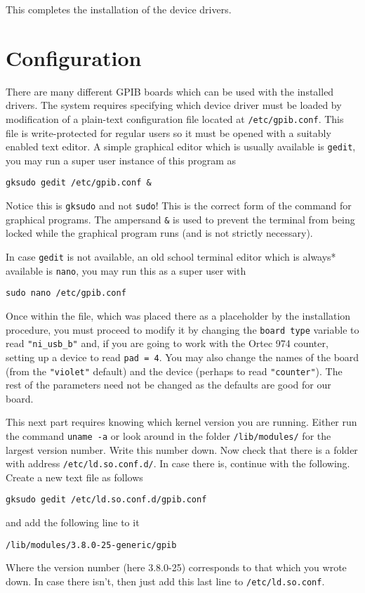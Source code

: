 \documentclass[letterpaper,11pt]{article}
\begin{document}
This completes the installation of the device drivers.

\section{Configuration}
There are many different GPIB boards which can be used with the installed drivers. The system requires specifying which device driver must be loaded by modification of a plain-text configuration file located at \texttt{/etc/gpib.conf}. This file is write-protected for regular users so it must be opened with a suitably enabled text editor. A simple graphical editor which is usually available is  \texttt{gedit}, you may run a super user instance of this program as
\begin{verbatim}
gksudo gedit /etc/gpib.conf &
 \end{verbatim}
Notice this is  \texttt{gksudo} and not \texttt{sudo}! This is the correct form of the command for graphical programs. The ampersand \texttt{\&} is used to prevent the terminal from being locked while the graphical program runs (and is not strictly necessary).

In case  \texttt{gedit} is not available, an old school terminal editor which is always* available is \texttt{nano}, you may run this as a super user with
\begin{verbatim}
sudo nano /etc/gpib.conf
\end{verbatim}
Once within the file, which was placed there as a placeholder by the installation procedure, you must proceed to modify it by changing the \texttt{board type} variable to read \texttt{"ni\_usb\_b"} and, if you are going to work with the Ortec 974 counter, setting up a device to read \texttt{pad = 4}. You may also change the names of the board (from the \texttt{"violet"} default) and the device (perhaps to read \texttt{"counter"}). The rest of the parameters need not be changed as the defaults are good for our board.

This next part requires knowing which kernel version you are running. Either run the command \texttt{uname -a} or look around in the folder \texttt{/lib/modules/} for the largest version number. Write this number down. Now check that there is a folder with address \texttt{/etc/ld.so.conf.d/}. In case there is, continue with the following. Create a new text file as follows
\begin{verbatim}
gksudo gedit /etc/ld.so.conf.d/gpib.conf
\end{verbatim}
and add the following line to it
\begin{verbatim}
/lib/modules/3.8.0-25-generic/gpib
\end{verbatim}
Where the version number (here 3.8.0-25) corresponds to that which you wrote down. In case there isn't, then just add this last line to \texttt{/etc/ld.so.conf}.
\end{document}
